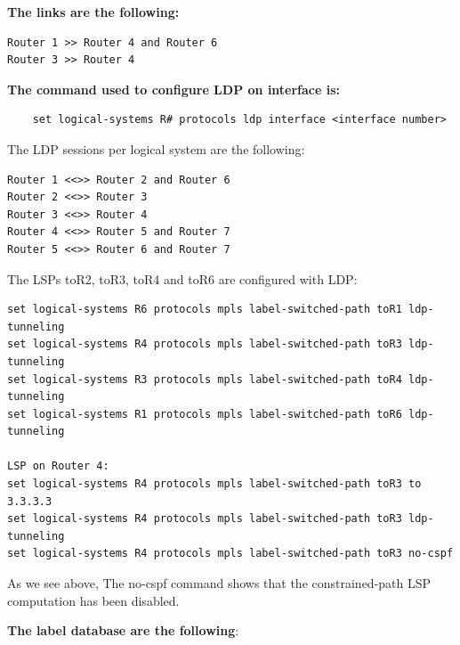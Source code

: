 \documentclass[a4paper]{article}
\begin{document}
\textbf{The links are the following:}

\begin{verbatim}
Router 1 >> Router 4 and Router 6
Router 3 >> Router 4
\end{verbatim}

\textbf{The command used to configure LDP on interface is:}

\begin{verbatim}
    set logical-systems R# protocols ldp interface <interface number>
\end{verbatim}


The LDP sessions per logical system are the following:

\begin{verbatim}
Router 1 <<>> Router 2 and Router 6
Router 2 <<>> Router 3
Router 3 <<>> Router 4
Router 4 <<>> Router 5 and Router 7
Router 5 <<>> Router 6 and Router 7
\end{verbatim}



The LSPs toR2, toR3, toR4 and toR6 are configured with LDP:

\begin{verbatim}
set logical-systems R6 protocols mpls label-switched-path toR1 ldp-tunneling
set logical-systems R4 protocols mpls label-switched-path toR3 ldp-tunneling
set logical-systems R3 protocols mpls label-switched-path toR4 ldp-tunneling
set logical-systems R1 protocols mpls label-switched-path toR6 ldp-tunneling

LSP on Router 4:
set logical-systems R4 protocols mpls label-switched-path toR3 to 3.3.3.3
set logical-systems R4 protocols mpls label-switched-path toR3 ldp-tunneling
set logical-systems R4 protocols mpls label-switched-path toR3 no-cspf
\end{verbatim}

As we see above, The no-cspf command shows that the constrained-path LSP computation has been disabled. 



\textbf{The label database are the following}:
\end{document}
